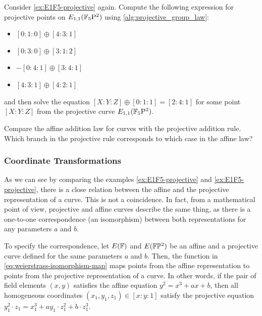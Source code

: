 
\begin{exercise} Consider \examplename{} \ref{ex:E1F5-projective} again. Compute the following expression for projective points on $E_{1,1}(\mathbb{F}_5\mathrm{P}^2)$ using \algname{} \ref{alg:projective_group_law}:
\begin{itemize}
\item $[0:1:0]\oplus [4:3:1]$
\item $[0:3:0]\oplus [3:1:2]$
\item $-[0:4:1]\oplus [3:4:1]$
\item $[4:3:1]\oplus [4:2:1]$
\end{itemize}
and then solve the equation $[X:Y:Z] \oplus [0:1:1]= [2:4:1]$ for some point $[X:Y:Z]$ from the projective  curve $E_{1,1}(\mathbb{F}_5\mathrm{P}^2)$.
\end{exercise}

\begin{exercise}
Compare the affine addition law for  curves with the projective addition rule. Which branch in the projective rule corresponds to which case in the affine law? 
\end{exercise}

\subsubsection{Coordinate Transformations} As we can see by comparing the examples 
\ref{ex:E1F5-projective} and \ref{ex:E1F5-projective}, there is a close relation between the affine and the projective representation of a  curve. This is not a coincidence. In fact, from a mathematical point of view, projective and affine  curves describe the same thing, as there is a one-to-one correspondence (an isomorphism) between both representations for any parameters $a$ and $b$. 

To specify the correspondence, let $E(\mathbb{F})$ and $E(\mathbb{F}\mathbb{P}^2)$ be an affine and a projective  curve defined for the same parameters $a$ and $b$. Then, the function in \eqref{eq:weierstrass-isomorphism-map} maps points from the affine representation to points from the projective representation of a  curve. In other words, if the pair of field elements $(x,y)$ satisfies the affine  equation $y^2= x^3 + ax + b$, then all homogeneous coordinates $(x_1,y_1,z_1)\in [x:y:1]$ satisfy the projective  equation $y_1^2\cdot z_1= x_1^3 + ay_1\cdot z_1^2 + b\cdot z_1^3$. 


